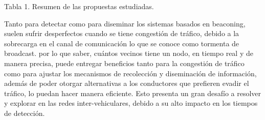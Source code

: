 Tabla 1. Resumen de las propuestas estudiadas.

Tanto para detectar como para diseminar  los sistemas basados en beaconing, suelen sufrir desperfectos cuando se tiene congestión de tráfico, debido a la sobrecarga en el canal de comunicación lo que se conoce como tormenta de broadcast. por lo que saber, cuántos vecinos tiene un nodo, en tiempo real y de manera precisa, puede entregar beneficios tanto para la congestión de tráfico como para ajustar los mecanismos de recolección y diseminación de información, además de poder otorgar alternativas a los conductores que prefieren evadir el tráfico, lo puedan hacer manera eficiente. Esto presenta un gran desafío a resolver y explorar en las redes inter-vehiculares, debido a su alto impacto en los tiempos de detección.
